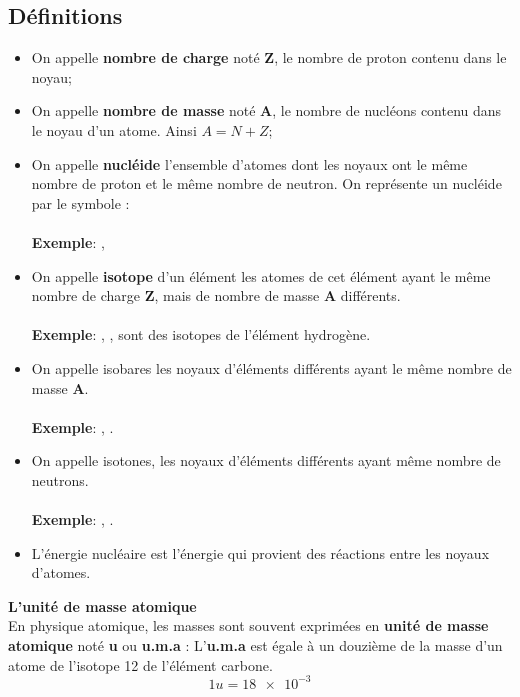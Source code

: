 \documentclass[french]{article}
\begin{document}
\subsection{Définitions}
\begin{itemize}
\item On appelle \textbf{nombre de charge} noté \textbf{Z}, le nombre de proton contenu dans le noyau;
\item On appelle \textbf{nombre de masse} noté \textbf{A}, le nombre de nucléons contenu dans le noyau d’un atome. Ainsi $A = N + Z$;
\item On appelle \textbf{nucléide} l’ensemble d’atomes dont les noyaux ont le même nombre de proton et le même nombre de neutron. On représente un nucléide par le symbole : \\\\
\textbf{Exemple}: , 
\item On appelle \textbf{isotope} d’un élément les atomes de cet élément ayant le même nombre de charge \textbf{Z}, mais de nombre de masse \textbf{A} différents.\\\\
\textbf{Exemple}: , ,  sont des isotopes de  l’élément hydrogène.
\item On appelle isobares les noyaux d’éléments différents ayant le même nombre de masse \textbf{A}.\\\\
\textbf{Exemple}: , .
\item On appelle isotones, les noyaux d’éléments différents ayant même nombre de neutrons.\\\\
\textbf{Exemple}: , .
\item L’énergie nucléaire est l’énergie qui provient des réactions entre les noyaux d’atomes.
\end{itemize}

\textbf{L’unité de masse atomique}\\
En physique atomique, les masses sont souvent exprimées en \textbf{unité de masse atomique} noté \textbf{u} ou \textbf{u.m.a} : L’\textbf{u.m.a} est égale à un douzième de la masse d’un atome de l’isotope 12 de l’élément carbone.$$1u = \num{18e-3}$$
\end{document}
